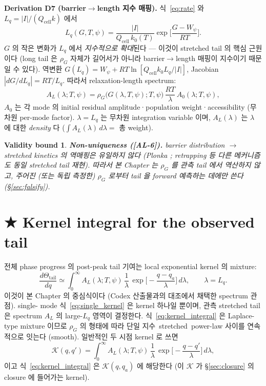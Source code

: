\documentclass[11pt,a4paper]{article}
\newtheorem*{boundbox}{Validity bound}
\newcommand{\cell}{\mathrm{cell}}
\newcommand{\AL}[1]{\textsf{[AL-#1]}}
\begin{document}
\textbf{Derivation D7 (barrier$\to$length 지수 매핑).} 식~\eqref{eq:rate} 와 $L_q=|I|/(Q_\cell k)$
에서
\begin{equation}
\boxed{\;L_q(G,T,\psi)=\frac{|I|}{Q_\cell\,k_0(T)}\exp\!\Big[\frac{G-W_\psi}{RT}\Big].\;}
\label{eq:L_of_G}
\end{equation}
$G$ 의 작은 변화가 $L_q$ 에서 \emph{지수적으로 확대}된다 — 이것이 stretched tail 의 핵심
근원이다 (long tail 은 $\rho_G$ 자체가 길어서가 아니라 barrier$\to$length 매핑이 지수이기
때문일 수 있다). 역변환 $G(L_q)=W_\psi+RT\ln[Q_\cell k_0 L_q/|I|]$, Jacobian $|dG/dL_q|=RT/L_q$.
따라서 relaxation-length spectrum:
\begin{equation}
A_L(\lambda;T,\psi)=\rho_G\big(G(\lambda,T,\psi);T,\psi\big)\,\frac{RT}{\lambda}\,A_0(\lambda;T,\psi),
\label{eq:spectrum}
\end{equation}
$A_0$ 는 각 mode 의 initial residual amplitude·population weight·accessibility (무차원
per-mode factor). $\lambda=L_q$ 는 무차원 integration variable 이며, $A_L(\lambda)$ 는
$\lambda$ 에 대한 \emph{density} 다 ($\int A_L(\lambda)\,d\lambda=$ 총 weight).
\begin{boundbox}
\textbf{Non-uniqueness (\AL{6}).} barrier distribution $\to$ stretched kinetics 의 역매핑은
\emph{유일하지 않다} (Plonka \cite{plonka2001}; retrapping 등 다른 메커니즘도 동일 stretched
tail 재현). 따라서 본 Chapter 는 $\rho_G$ 를 관측 tail 에서 \emph{역산하지 않고},
주어진 (또는 독립 측정한) $\rho_G$ 로부터 tail 을 \emph{forward 예측}하는 데에만 쓴다
(\S\ref{sec:falsify}).
\end{boundbox}

\section{★ Kernel integral for the observed tail}\label{sec:kernel}
전체 phase progress 의 post-peak tail 기여는 local exponential kernel 의 mixture:
\begin{equation}
\boxed{\;\frac{d\Theta_\mathrm{tail}}{dq}\simeq\int_0^\infty A_L(\lambda;T,\psi)\,\frac1\lambda\,
\exp\!\Big[-\frac{q-q_a}{\lambda}\Big]\,d\lambda,\qquad \lambda=L_q.\;}
\label{eq:kernel_integral}
\end{equation}
이것이 본 Chapter 의 중심식이다 (Codex 산출물과의 대조에서 채택한 spectrum 관점). single-
mode 식~\eqref{eq:single_kernel} 은 kernel 하나일 뿐이며, 관측 stretched tail 은 spectrum
$A_L$ 의 large-$L_q$ 영역이 결정한다. 식~\eqref{eq:kernel_integral} 은 Laplace-type mixture
이므로 $\rho_G$ 의 형태에 따라 단일 지수~stretched~power-law 사이를 연속적으로 잇는다
(smooth). 일반적인 두 시점 kernel 로 쓰면
\begin{equation}
\mathcal K(q,q')=\int_0^\infty A_L(\lambda;T,\psi)\,\frac1\lambda\,\exp\!\Big[-\frac{q-q'}{\lambda}\Big]\,d\lambda,
\label{eq:K_def}
\end{equation}
이고 식~\eqref{eq:kernel_integral} 은 $\mathcal K(q,q_a)$ 에 해당한다 (이 $\mathcal K$ 가
\S\ref{sec:closure} 의 closure 에 들어가는 kernel).
\end{document}
